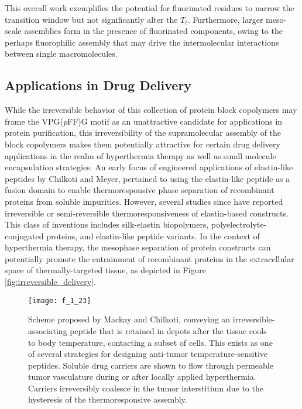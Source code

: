 \begin{refsection}
This overall work exemplifies the potential for fluorinated residues to narrow
the transition window but not significantly alter the ${T_t}$. Furthermore,
larger meso-scale assemblies form in the presence of fluorinated components,
owing to the perhaps fluorophilic assembly that may drive the intermolecular
interactions between single macromolecules.

\subsection{Applications in Drug Delivery}
\label{sec:pff_app_drug}

While the irreversible behavior of this collection of protein block copolymers
may frame the VPG(\emph{p}FF)G motif as an unattractive candidate for
applications in protein purification, this irreversibility of the supramolecular
assembly of the block copolymers makes them potentially attractive for certain drug delivery
applications in the realm of hyperthermia therapy as well as small molecule
encapsulation strategies. An early focus of engineered applications of 
elastin-like peptides by Chilkoti and Meyer, pertained to 
using the elastin-like peptide as a fusion domain to enable thermoresponsive
phase separation of recombinant proteins from soluble
impurities.\cite{Meyer1999,Meyer2001} However, several studies since have reported
irreversible or semi-reversible thermoresponsiveness of elastin-based
constructs. This class of inventions includes silk-elastin biopolymers,
polyelectrolyte-conjugated proteins, and elastin-like peptide
variants.\cite{Herrero-Vanrell2005,Megeed2002,Kayitmazer2007} In the context of
hyperthermia therapy, the mesophase separation of protein constructs can
potentially promote the entrainment of recombinant proteins in the extracellular
space of thermally-targeted tissue, as depicted in Figure
\ref{fig:irreversible_delivery}.
\begin{figure}[h!] \centering \texttt{[image: f\_1\_23]}
    \caption[Scheme proposed by Mackay and Chilkoti, conveying an
        irreversible-associating peptide that is retained in depots after the
        tissue cools to body temperature, contacting a subset of cells. This
        exists as one of several strategies for designing anti-tumor
        temperature-sensitive peptides. Soluble drug carriers are shown to flow
        through permeable tumor vasculature during or after locally applied
        hyperthermia. Carriers irreversibly coalesce in the tumor interstitium
        due to the hysteresis of the thermoresponsive assembly.]
{Scheme proposed by Mackay and Chilkoti,\cite{Mackay2008} conveying an
irreversible-associating peptide that is retained in depots after the tissue
cools to body temperature, contacting a subset of cells. This exists as one of
several strategies for designing anti-tumor temperature-sensitive peptides.
Soluble drug carriers are shown to flow through permeable tumor vasculature
during or after locally applied hyperthermia. Carriers irreversibly coalesce in
the tumor interstitium due to the hysteresis of the thermoresponsive assembly.}


\end{figure}
\end{refsection}
